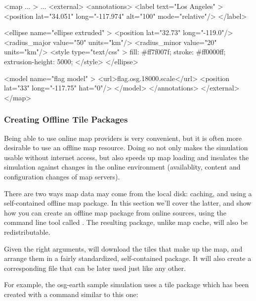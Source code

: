 \begin{filelisting}
<map ... >
    ...
    <external>
        <annotations>
            <label text="Los Angeles" >
                <position lat="34.051" long="-117.974" alt="100" mode="relative"/>
            </label>

            <ellipse name="ellipse extruded" >
                <position lat="32.73" long="-119.0"/>
                <radius_major value="50" units="km"/>
                <radius_minor value="20" units="km"/>
                <style type="text/css" >
                    fill:             #ff7f007f;
                    stroke:           #ff0000ff;
                    extrusion-height: 5000;
                </style>
            </ellipse>

            <model name="flag model" >
                <url>flag.osg.18000.scale</url>
                <position lat="33" long="-117.75" hat="0"/>
            </model>
        </annotations>
    </external>
</map>
\end{filelisting}


\subsubsection{Creating Offline Tile Packages}
\label{sec:graphics:offline-tiles}

Being able to use online map providers is very convenient, but it is
often more desirable to use an offline map resource. Doing so not only makes
the simulation usable without internet access, but also speeds up map
loading and insulates the simulation against changes in the online environment
(availablity, content and configuration changes of map servers).

There are two ways map data may come from the local disk: caching, and
using a self-contained offline map package. In this section we'll cover the
latter, and show how you can create an offline map package from online sources,
using the command line tool called . The resulting
package, unlike map cache, will also be redistributable.

Given the right arguments,  will download the tiles
that make up the map, and arrange them in a fairly standardized, self-contained
package. It will also create a corresponding  file that can be later
used just like any other.

For example, the osg-earth sample simulation uses a tile package which has been
created with a command similar to this one:

